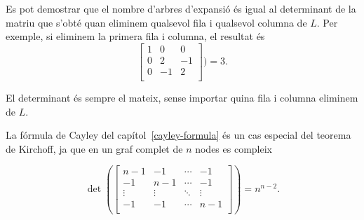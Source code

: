 Es pot demostrar que el nombre d'arbres d'expansió és igual al
determinant de la matriu que s'obté quan eliminem qualsevol fila i
qualsevol columna de $L$. Per exemple, si eliminem la primera fila i
columna, el resultat és
\[
\begin{bmatrix}
  1 & 0 & 0 \\
  0 & 2 & -1 \\
  0 & -1 & 2 \\
 \end{bmatrix}
) =3.\]

El determinant és sempre el mateix, sense importar quina fila i columna eliminem
de $L$.

La fórmula de Cayley del capítol~\ref{cayley-formula} és un
cas especial del teorema de Kirchoff, ja que en un graf complet
de $n$ nodes es compleix

\[ \det(
\begin{bmatrix}
  n-1 & -1 & \cdots & -1 \\
  -1 & n-1 & \cdots & -1 \\
  \vdots & \vdots & \ddots & \vdots \\
  -1 & -1 & \cdots & n-1 \\
 \end{bmatrix}
) =n^{n-2}.\]

